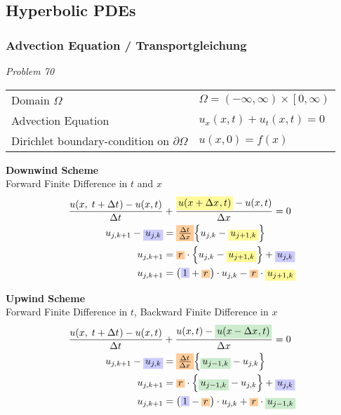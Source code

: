 \documentclass[
	final,
	a4paper,
	oneside,
	parskip=full,
	headings=standardclasses,
	headings=big,
	pointednumbers,
    fleqn
]{scrartcl}
\newcommand{\tfillb}[1]{\tfillc[#1][blue!20]}
\newcommand{\tfillo}[1]{\tfillc[#1][orange!40]}
\newcommand{\tfillg}[1]{\tfillc[#1][Green!20]}
\newcommand{\tfilly}[1]{\tfillc[#1][yellow!40]}
\newcommand{\f}[2]{\frac{#1}{#2}}
\newcommand{\fs}[2]{{\tfrac{#1}{#2}}}
\newcommand{\kl}[1]{{\left( #1 \right)}}
\newcommand{\kq}[1]{{\left\{ #1 \right\}}}
\newcommand{\dom}{{\Omega}}
\newcommand{\bound}{{\partial \Omega}}
\begin{document}
    \subsection*{Hyperbolic PDEs}
    \subsubsection*{Advection Equation / Transportgleichung}
    
    {\it{Problem 70}} \\
    \begin{tabular}{p{5cm}l}
        Domain $\dom$                 & $\Omega = \kl{-\infty, \infty} \times \left[ 0, \infty \right)$ \\
        Advection Equation              & $u_x\kl{x,t} + u_t\kl{x,t} = 0$ \\
        Dirichlet boundary-condition on $\bound$    & $u\kl{x,0} = f\kl{x}$
    \end{tabular}

    {\bf{Downwind Scheme}} \\
    Forward Finite Difference in $t$ and $x$ \\
    {\setlength{\abovedisplayskip}{-6pt}
    \setlength{\belowdisplayskip}{-12pt}
    \begin{align*}
        \f{u \kl{x,\;t + \dt} - u \kl{x, t}}{\dt} &+ \f{ \tfilly{$u \kl{x + \dx, t}$} - u\kl{x, t}}{\dx} = 0 \\
        u_{j,k+1} - \tfillb{$u_{j,k}$}  &= \tfillo{${\fs{\dt}{\dx}}$} \kq{u_{j,k} - \tfilly{$u_{j+1,k}$}} \\
        u_{j,k+1}                       &= \tfillo{$r$} \cdot \kq{u_{j,k} - \tfilly{$u_{j+1,k}$}} + \tfillb{$u_{j,k}$} \\
        u_{j,k+1}                       &= \kl{\tfillb{$1$}+\tfillo{$r$}} \cdot u_{j,k} - \tfillo{$r$} \cdot \tfilly{$u_{j+1,k}$}
    \end{align*}}

    {\bf{Upwind Scheme}} \\
    Forward Finite Difference in $t$, Backward Finite Difference in $x$ \\
    {\setlength{\abovedisplayskip}{-6pt}
    \setlength{\belowdisplayskip}{-12pt}
    \begin{align*}
        \f{u \kl{x,\;t + \dt} - u \kl{x, t}}{\dt} &+ \f{u\kl{x, t} - \tfillg{$u \kl{x - \dx, t}$}}{\dx} = 0 \\
        u_{j,k+1} - \tfillb{$u_{j,k}$}  &= \tfillo{${\fs{\dt}{\dx}}$} \kq{\tfillg{$u_{j-1,k}$} - u_{j,k}} \\
        u_{j,k+1}                       &= \tfillo{$r$} \cdot \kq{\tfillg{$u_{j-1,k}$} - u_{j,k}} + \tfillb{$u_{j,k}$} \\
        u_{j,k+1}                       &= \kl{\tfillb{$1$}-\tfillo{$r$}} \cdot u_{j,k} + \tfillo{$r$} \cdot \tfillg{$u_{j-1,k}$}
    \end{align*}}
\end{document}
